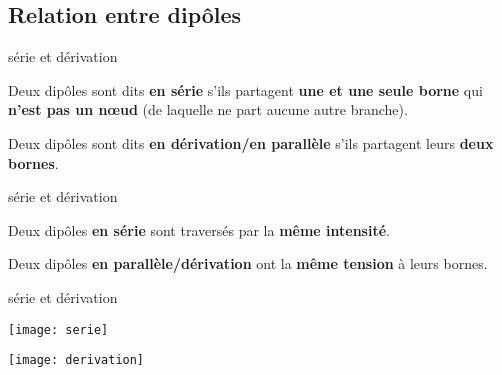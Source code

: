 \documentclass[../main/main.tex]{subfiles}
\begin{document}
\subsection{Relation entre dipôles}
\begin{tcbraster}[raster columns=3, raster equal height=rows]
    
\begin{defi}[label=def:serdiv, valign lower=center, valign upper=center]
    {série et dérivation}

    Deux dipôles sont dits \textbf{en série} s'ils partagent \textbf{une et une
    seule borne} qui \textbf{n'est pas un nœud} (de laquelle ne part aucune
    autre branche).\vspace{10pt}

    \tcblower
    Deux dipôles sont dits \textbf{en dérivation/en parallèle} s'ils partagent
    leurs \textbf{deux bornes}.
\end{defi}
\begin{coro}[label=coro:serdiv, valign lower=center, valign upper=center]
    {série et dérivation}

    Deux dipôles \textbf{en série} sont traversés par la \textbf{même
    intensité}. \vspace{56pt}

    \tcblower

    Deux dipôles \textbf{en parallèle/dérivation} ont la \textbf{même tension} à
    leurs bornes.

\end{coro}
\begin{exem}[label=exem:serdiv]{série et dérivation}
    \begin{center}
        \texttt{[image: serie]}
    \end{center}
    \tcblower
    \begin{center}
        \texttt{[image: derivation]}
    \end{center}
\end{exem}
\end{tcbraster}
\end{document}
